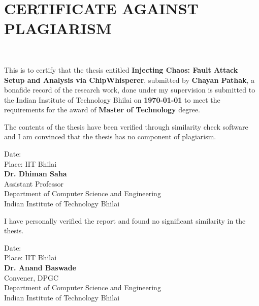 \chapter[Approval]{CERTIFICATE AGAINST PLAGIARISM}
\thispagestyle{myHeader}

\hspace{0pt plus 1filll} \\
  
 \begin{Spacing}{1}
 	\sffamily
 	
\noindent 	
This is to certify that the thesis entitled \textbf{Injecting Chaos: Fault Attack Setup and Analysis via ChipWhisperer}, submitted by \textbf{Chayan Pathak}, a bonafide record of the research work, done under my supervision is submitted to the Indian Institute of Technology Bhilai on {\bfseries \today} to meet the requirements for the award of {\bfseries Master of Technology} degree.

The contents of the thesis have been verified through similarity check software and I am convinced that the thesis has no component of plagiarism.\\

\vspace{1em}
\setlength{}
\begin{multicols}{2}
\noindent
Date:\\
Place: IIT Bhilai\\


\columnbreak
\noindent
{\bfseries Dr. Dhiman Saha}\\
Assistant Professor\\
Department of Computer Science and Engineering\\
Indian Institute of Technology Bhilai
\end{multicols}

\vspace{0.8em}
I have personally verified the report and found no significant similarity in the thesis.\\

\vspace{1em}
\setlength{}
\begin{multicols}{2}
\noindent
Date:\\
Place: IIT Bhilai\\


\columnbreak
\noindent
{\bfseries Dr. Anand Baswade}\\
Convener, DPGC\\
Department of Computer Science and Engineering\\
Indian Institute of Technology Bhilai
\end{multicols}

\end{Spacing}
